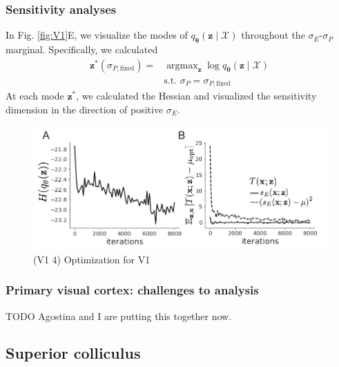 \documentclass[11pt]{article}
\DeclareMathOperator*{\argmax}{argmax}
\begin{document}
\subsubsection{Sensitivity analyses}
In Fig. \ref{fig:V1}E, we visualize the modes of $q_{\bm{\theta}}(\mathbf{z} \mid \mathcal{X})$ throughout the $\sigma_E$-$\sigma_P$ marginal.
Specifically, we calculated
\begin{equation}
\begin{split}
\mathbf{z}^*(\sigma_{P,\text{fixed}}) = &\argmax_{\mathbf{z}} \log q_{\bm{\theta}}(\mathbf{z} \mid \mathcal{X}) \\
&\text{s.t. } \sigma_P = \sigma_{P,\text{fixed}}\
\end{split}
\end{equation}
At each mode $\mathbf{z}^*$, we calculated the Hessian and visualized the sensitivity dimension in the direction of positive $\sigma_E$.

\begin{figure}[h]
\caption{\small (V1 4)
Optimization for V1
 }
 \label{fig:V1_4}
\begin{center}
\includegraphics[scale=.8]{figures/figV1_4/figV1_4.pdf}
\end{center}
\end{figure}

\subsubsection{Primary visual cortex: challenges to analysis}\label{methods_V1_complexity}
TODO Agostina and I are putting this together now.

\subsection{Superior colliculus}\label{methods_SC}
\end{document}
